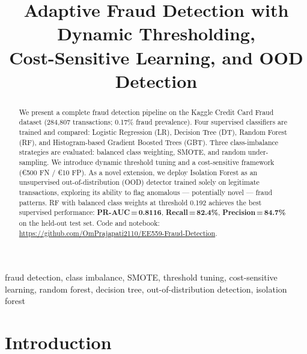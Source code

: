 \documentclass[conference]{IEEEtran}
\begin{document}
\title{Adaptive Fraud Detection with Dynamic Thresholding,\\
       Cost-Sensitive Learning, and OOD Detection}

\author{
}

\maketitle

\begin{abstract}
We present a complete fraud detection pipeline on the Kaggle Credit Card Fraud
dataset (284,807 transactions; 0.17\% fraud prevalence). Four supervised classifiers
are trained and compared: Logistic Regression (LR), Decision Tree (DT), Random Forest
(RF), and Histogram-based Gradient Boosted Trees (GBT). Three class-imbalance strategies
are evaluated: balanced class weighting, SMOTE, and random under-sampling. We introduce
dynamic threshold tuning and a cost-sensitive framework (\euro500 FN / \euro10 FP). As a
novel extension, we deploy Isolation Forest as an unsupervised out-of-distribution (OOD)
detector trained solely on legitimate transactions, exploring its ability to flag
anomalous --- potentially novel --- fraud patterns. RF with balanced class weights at
threshold 0.192 achieves the best supervised performance: \textbf{PR-AUC\,=\,0.8116},
\textbf{Recall\,=\,82.4\%}, \textbf{Precision\,=\,84.7\%} on the held-out test set.
Code and notebook: \url{https://github.com/OmPrajapati2110/EE559-Fraud-Detection}.
\end{abstract}

\begin{IEEEkeywords}
fraud detection, class imbalance, SMOTE, threshold tuning, cost-sensitive learning,
random forest, decision tree, out-of-distribution detection, isolation forest
\end{IEEEkeywords}

\section{Introduction}
\end{document}
